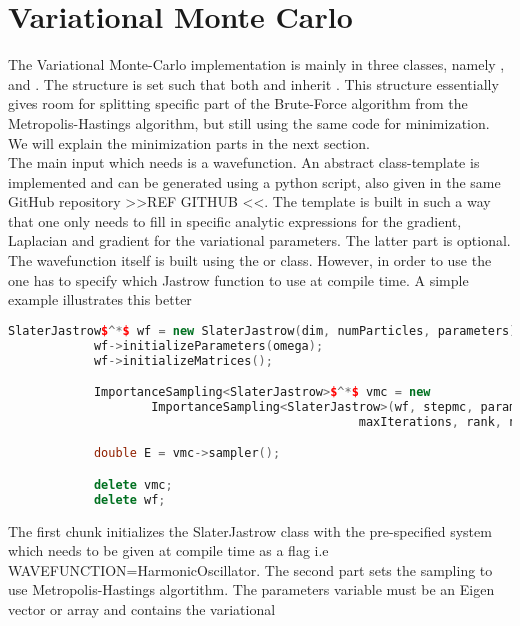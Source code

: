 \section{Variational Monte Carlo}
    The Variational Monte-Carlo implementation is mainly in three classes,
    namely ,  and
    . The structure is set such that both
     and  inherit
    . This structure essentially gives room for splitting
    specific part of the Brute-Force algorithm from the Metropolis-Hastings
    algorithm, but still using the same code for minimization. We will explain
    the minimization parts in the next section. \\ 
    The main input which  needs is a wavefunction. An abstract
    class-template is implemented and can be generated using a python script,
    also given in the same GitHub repository >>REF GITHUB <<. The template is
    built in such a way that one only needs to fill in specific analytic
    expressions for the gradient, Laplacian and gradient for the variational
    parameters. The latter part is optional. \\ 
    The wavefunction itself is built using the  or
     class. However, in order to use the
     one has to specify which Jastrow function to use
    at compile time. A simple example illustrates this better
        \begin{lstlisting}[language=C++, style=ccstyle]
            SlaterJastrow$^*$ wf = new SlaterJastrow(dim, numParticles, parameters);
            wf->initializeParameters(omega);
            wf->initializeMatrices();

            ImportanceSampling<SlaterJastrow>$^*$ vmc = new
                    ImportanceSampling<SlaterJastrow>(wf, stepmc, parameters,
                                                 maxIterations, rank, numProcs);

            double E = vmc->sampler();

            delete vmc;
            delete wf;
        \end{lstlisting}
    The first chunk initializes the SlaterJastrow class with the pre-specified
    system which needs to be given at compile time as a flag i.e
    WAVEFUNCTION=HarmonicOscillator. The second part sets the sampling to use
    Metropolis-Hastings algortithm. The parameters variable must be an
    Eigen\cite{eigenweb} vector or array and contains the variational
